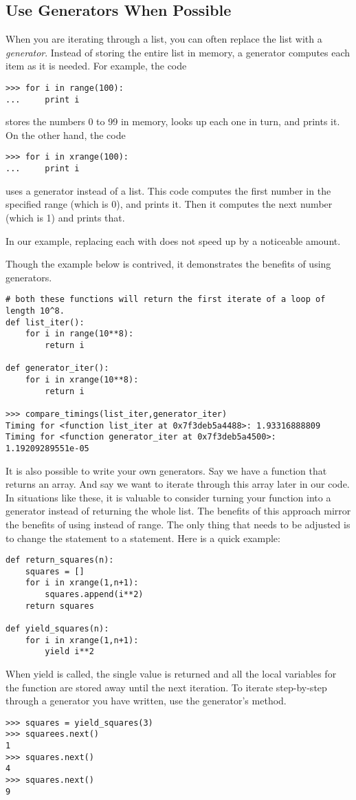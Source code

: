 \subsection*{Use Generators When Possible}
When you are iterating through a list, you can often replace the list with a \emph{generator}.
Instead of storing the entire list in memory, a generator computes each item as it is needed.
For example, the code
\begin{lstlisting}
>>> for i in range(100):
...     print i
\end{lstlisting}
stores the numbers 0 to 99 in memory, looks up each one in turn, and prints it.
On the other hand, the code
\begin{lstlisting}
>>> for i in xrange(100):
...     print i
\end{lstlisting}
uses a generator instead of a list.
This code computes the first number in the specified range (which is 0), and prints it.
Then it computes the next number (which is 1) and prints that.

In our example, replacing each  with  does not speed up  by a noticeable amount.

Though the example below is contrived, it demonstrates the benefits of using generators.
\begin{lstlisting}
# both these functions will return the first iterate of a loop of length 10^8.
def list_iter():
    for i in range(10**8):
        return i

def generator_iter():
    for i in xrange(10**8):
        return i

>>> compare_timings(list_iter,generator_iter)
Timing for <function list_iter at 0x7f3deb5a4488>: 1.93316888809
Timing for <function generator_iter at 0x7f3deb5a4500>: 1.19209289551e-05
\end{lstlisting}

It is also possible to write your own generators.
Say we have a function that returns an array. And say we want to iterate through this array later in our code. In situations like these, it is valuable to consider turning your function into a generator instead of returning the whole list. The benefits of this approach mirror the benefits of using  instead of {range}. The only thing that needs to be adjusted is to change the  statement to a  statement. Here is a quick example:
\begin{lstlisting}
def return_squares(n):
    squares = []
    for i in xrange(1,n+1):
        squares.append(i**2)
    return squares

def yield_squares(n):
    for i in xrange(1,n+1):
        yield i**2
\end{lstlisting}
When yield is called, the single value is returned and all the local variables for the function are stored away until the next iteration. To iterate step-by-step through a generator you have written, use the generator's  method.
\begin{lstlisting}
>>> squares = yield_squares(3)
>>> squarees.next()
1
>>> squares.next()
4
>>> squares.next()
9
\end{lstlisting}

